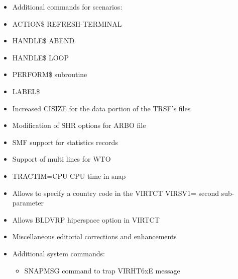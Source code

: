 \documentclass[letterpaper,10pt,english]{sphinxmanual}
\begin{document}
\begin{itemize}
\item {} 
Additional commands for scenarios:

\item {} 
ACTION\$ REFRESH-TERMINAL

\item {} 
HANDLE\$ ABEND

\item {} 
HANDLE\$ LOOP

\item {} 
PERFORM\$ subroutine

\item {} 
LABEL\$

\end{itemize}

\begin{itemize}
\item {} 
Increased CISIZE for the data portion of the TRSF’s files

\item {} 
Modification of SHR options for ARBO file

\item {} 
SMF support for statistics records

\item {} 
Support of multi lines for WTO

\item {} 
TRACTIM=CPU CPU time in snap

\item {} 
Allows to specify a country code in the VIRTCT VIRSV1= second
sub-parameter

\item {} 
Allows BLDVRP hiperspace option in VIRTCT

\item {} 
Miscellaneous editorial corrections and enhancements

\item {} 
Additional system commands:
\begin{itemize}
\item {} 
SNAPMSG command to trap VIRHT6xE message

\end{itemize}

\end{itemize}
\end{document}
